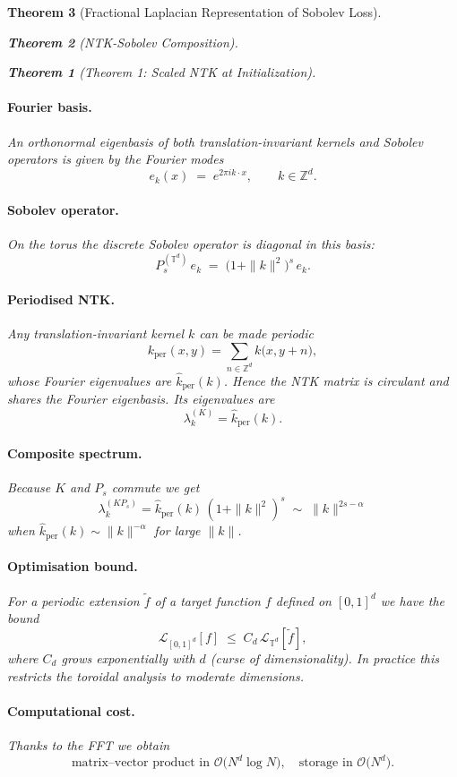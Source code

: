 \documentclass{article}
\newtheorem{theorem}{Theorem}[section]
\begin{document}
\begin{theorem}[Fractional Laplacian Representation of Sobolev Loss]
\begin{theorem}[NTK-Sobolev Composition]
\begin{theorem}[Theorem 1: Scaled NTK at Initialization]
\paragraph{Fourier basis.}  An orthonormal eigenbasis of both translation-invariant kernels and Sobolev operators is given by the Fourier modes
\[
   e_k(x) \;=\; e^{2\pi i k\cdot x}, \qquad k\in\mathbb Z^d.
\]

\paragraph{Sobolev operator.}  On the torus the discrete Sobolev operator is diagonal in this basis:
\[
   P_s^{(\mathbb{T}^d)}\,e_k\;=\;\bigl(1+\|k\|^2\bigr)^{s}\,e_k.
\]

\paragraph{Periodised NTK.}  Any translation-invariant kernel $k$ can be made periodic
\[
   k_{\text{per}}(x,y)=\sum_{n\in\mathbb Z^d} k\bigl(x, y+n\bigr),
\]
whose Fourier eigenvalues are $\widehat{k}_{\text{per}}(k)$.  Hence the NTK matrix is circulant and shares the Fourier eigenbasis.  Its eigenvalues are
\[
   \lambda_k^{(K)}=\widehat{k}_{\text{per}}(k).
\]

\paragraph{Composite spectrum.}  Because $K$ and $P_s$ commute we get
\[
   \lambda_k^{(KP_s)} = \widehat{k}_{\text{per}}(k)\,(1+\|k\|^2)^{s}
   \;\sim\; \|k\|^{2s-\alpha}
\]
when $\widehat{k}_{\text{per}}(k)\sim\|k\|^{-\alpha}$ for large $\|k\|$.

\paragraph{Optimisation bound.}  For a periodic extension $\tilde f$ of a target function $f$ defined on $[0,1]^d$ we have the bound
\[
   \mathcal L_{[0,1]^d}[f]\;\le\; C_d\,\mathcal L_{\mathbb T^d}[\tilde f],
\]
where $C_d$ grows exponentially with $d$ (curse of dimensionality).  In practice this restricts the toroidal analysis to moderate dimensions.

\paragraph{Computational cost.}  Thanks to the FFT we obtain
\[
   \text{matrix–vector product in }\mathcal O\bigl(N^d\log N\bigr), \quad
   \text{storage in }\mathcal O\bigl(N^d\bigr).
\]


\end{theorem}
\end{theorem}
\end{theorem}
\end{document}
